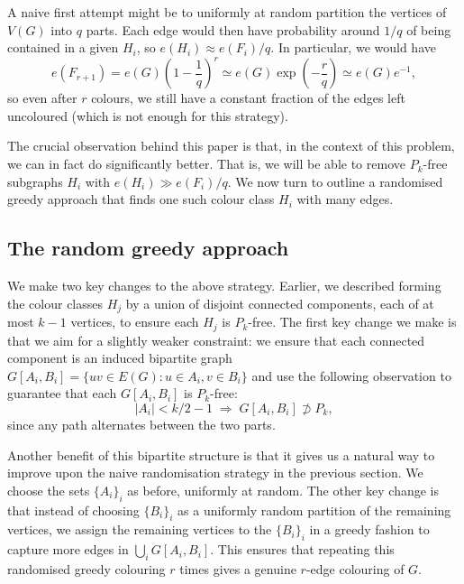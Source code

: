 \documentclass[12pt,reqno]{amsart}
\theoremstyle{remark}
\numberwithin{theorem}{section}
\renewcommand{\(}{\bigl(}
\renewcommand{\)}{\bigr)\vphantom{)}}
\begin{document}
A naive first attempt might be to uniformly at random partition the vertices of $V(G)$ into $q$ parts. Each edge would then have probability around $1/q$ of being contained in a given $H_i$, so $e(H_i) \approx e(F_i)/q$. In particular, we would have 
\[e(F_{r+1})=e(G)\left(1- \frac{1}{q} \right)^r\simeq e(G)\exp\left(- \frac{r}{q} \right)\simeq e(G)e^{-1},\] 
so even after $r$ colours, we still have a constant fraction of the edges left uncoloured (which is not enough for this strategy). 

The crucial observation behind this paper is that, in the context of this problem, we can in fact do significantly better. That is, we will be able to remove $P_k$-free subgraphs $H_i$ with $e(H_i) \gg e(F_i)/q$. We now turn to outline a randomised greedy approach that finds one such colour class $H_i$ with many edges.

\subsection{The random greedy approach}\label{sec:random-greedy}

We make two key changes to the above strategy. Earlier, we described forming the colour classes $H_j$ by a union of disjoint connected components, each of at most $k-1$ vertices, to ensure each $H_j$ is $P_k$-free. The first key change we make is that we aim for a slightly weaker constraint: we ensure that each connected component is an induced bipartite graph $G[A_i,B_i]=\{uv\in E(G):u\in A_i, v\in B_i\}$ and use the following observation to guarantee that each $G[A_i,B_i]$ is $P_k$-free: 
\begin{equation}\label{eq:pk-free}
    |A_i| < k/2 - 1 \;  \Longrightarrow \; G[A_i, B_i] \not \supset P_k,
\end{equation}
since any path alternates between the two parts.

Another benefit of this bipartite structure is that it gives us a natural way to improve upon the naive randomisation strategy in the previous section. We choose the sets $\{A_i \}_i$ as before, uniformly at random. The other key change is that instead of choosing $\{ B_i\}_i$ as a uniformly random partition of the remaining vertices, we assign the remaining vertices to the $\{ B_i \}_i$ in a greedy fashion to capture more edges in $\bigcup_i G[A_i, B_i]$. This ensures that repeating this randomised greedy colouring $r$ times gives a genuine $r$-edge colouring of $G$.
\end{document}
